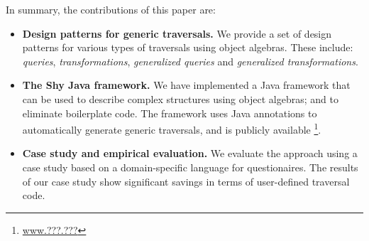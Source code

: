 In summary, the contributions of this paper are:

\begin{itemize}

\item {\bf Design patterns for generic traversals.} We provide a set of design 
patterns for various types of traversals using object algebras. These include: 
\emph{queries}, \emph{transformations},
\emph{generalized queries} and \emph{generalized transformations}.

\item {\bf The Shy Java framework.} We have implemented 
a Java framework that can be used to describe complex structures using 
object algebras; and to eliminate boilerplate code. The framework uses Java 
annotations to automatically generate generic traversals, and is publicly available
\footnote{\url{www.???.???}}.

\item {\bf Case study and empirical evaluation.} We evaluate the approach using 
a case study based on a domain-specific language for questionaires. The results 
of our case study show significant savings in terms of user-defined traversal code.

\end{itemize}
